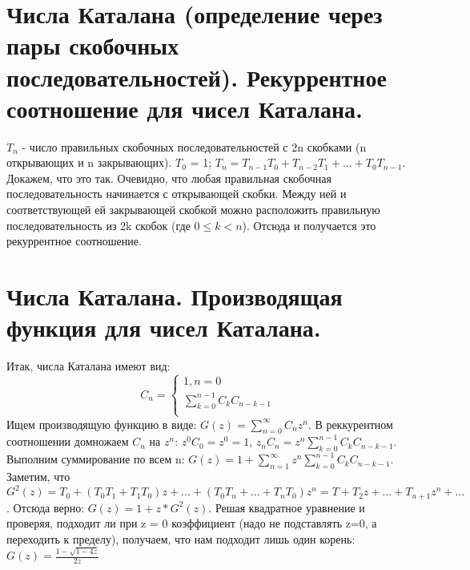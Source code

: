\setcounter{section}{58}

\section{Числа Каталана (определение через пары скобочных последовательностей). Рекуррентное соотношение для чисел Каталана.}

$T_n$ - число правильных скобочных последовательностей с 2n скобками (n открывающих и n закрывающих).
$T_0$ = 1; $T_n = T_{n-1}T_0 + T_{n-2}T_1 + \dots + T_0T_{n-1}$.
Докажем, что это так. Очевидно, что любая правильная скобочная последовательность начинается с открывающей скобки. Между ней и соответствующей ей закрывающей скобкой можно расположить правильную последовательность из 2k скобок (где $0\leqslant k<n$). Отсюда и получается это рекуррентное соотношение.

\section{Числа Каталана. Производящая функция для чисел Каталана.}
Итак, числа Каталана имеют вид:
\[ C_n = \left\{
  \begin{array}{ccc}
    1, n = 0 \\
    \sum_{k=0}^{n-1} C_k C_{n-k-1}\\
  \end{array}
\right. \]
Ищем производящую функцию в виде: $G(z) = \sum_{n=0}^{\infty}C_n z^n$. В реккурентном соотношении домножаем $C_n$ на $z^n$: $z^0 C_0 = z^0 = 1$, $z_n C_n = z^n \sum_{k=0}^{n-1} C_k C_{n-k-1}$. Выполним суммирование по всем n: $G(z) = 1 + \sum_{n=1}^{\infty}z^n \sum_{k=0}^{n-1} C_k C_{n-k-1}$. Заметим, что $G^2(z) = T_0 + (T_0T_1 + T_1T_0)z + \dots + (T_0T_n + \dots + T_nT_0)z^n = T + T_2z + \dots + T_{n+1}z^n + \dots$. Отсюда верно: $G(z) = 1 + z*G^2(z)$. Решая квадратное уравнение и проверяя, подходит ли при z = 0 коэффициент (надо не подставлять z=0, а переходить к пределу), получаем, что нам подходит лишь один корень: $G(z) = \frac{1 - \sqrt{1-4z}}{2z}$

